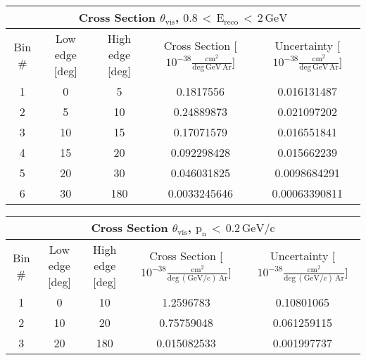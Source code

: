 \begin{table}[H]
\raggedright
\begin{adjustbox}{width=\textwidth}
\small
\begin{tabular}{ |c|c|c|c|c| }
\hline
\multicolumn{5}{|c|}{Cross Section $\theta_{\mathrm{vis}}$, $\mathrm{0.8\,<\,E_{reco}\,<\,2\,GeV}$} \\
\hline
\hline
Bin \# & Low edge [deg] & High edge [deg] & Cross Section [$10^{-38}\mathrm{\frac{cm^{2}}{deg\,GeV\,Ar}}$] & Uncertainty [$10^{-38}\mathrm{\frac{cm^{2}}{deg\,GeV\,Ar}}$] \\
\hline
\hline
1 & 0 & 5 & 0.1817556 & 0.016131487\\
2 & 5 & 10 & 0.24889873 & 0.021097202\\
3 & 10 & 15 & 0.17071579 & 0.016551841\\
4 & 15 & 20 & 0.092298428 & 0.015662239\\
5 & 20 & 30 & 0.046031825 & 0.0098684291\\
6 & 30 & 180 & 0.0033245646 & 0.00063390811\\
\hline
\end{tabular}
\end{adjustbox}
\end{table}


\begin{table}[H]
\raggedright
\begin{adjustbox}{width=\textwidth}
\small
\begin{tabular}{ |c|c|c|c|c| }
\hline
\multicolumn{5}{|c|}{Cross Section $\theta_{\mathrm{vis}}$, $\mathrm{p_{n}\,<\,0.2\,GeV/c}$} \\
\hline
\hline
Bin \# & Low edge [deg] & High edge [deg] & Cross Section [$10^{-38}\mathrm{\frac{cm^{2}}{deg\,(GeV/c)\,Ar}}$] & Uncertainty [$10^{-38}\mathrm{\frac{cm^{2}}{deg\,(GeV/c)\,Ar}}$] \\
\hline
\hline
1 & 0 & 10 & 1.2596783 & 0.10801065\\
2 & 10 & 20 & 0.75759048 & 0.061259115\\
3 & 20 & 180 & 0.015082533 & 0.001997737\\
\hline
\end{tabular}
\end{adjustbox}
\end{table}


